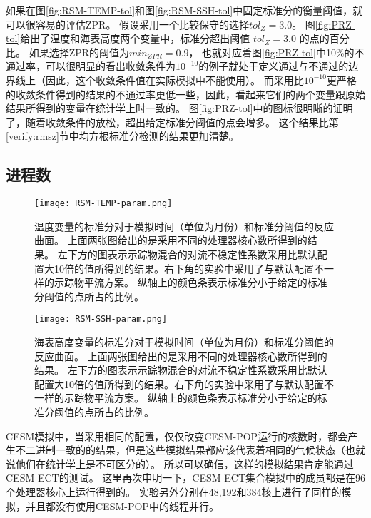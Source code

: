如果在图\ref{fig:RSM-TEMP-tol}和图\ref{fig:RSM-SSH-tol}中固定标准分的衡量阈值，就可以很容易的评估ZPR。 
假设采用一个比较保守的选择$tol_{Z} = 3.0$。 
图\ref{fig:PRZ-tol}给出了温度和海表高度两个变量中，标准分超出阈值 $tol_{Z} = 3.0$ 的点的百分比。 
如果选择ZPR的阈值为$min_{ZPR} = 0.9$， 也就对应着图\ref{fig:PRZ-tol}中10\%的不通过率，可以很明显的看出收敛条件为$10^{-10}$的例子就处于定义通过与不通过的边界线上（因此，这个收敛条件值在实际模拟中不能使用）。 
而采用比$10^{-10}$更严格的收敛条件得到的结果的不通过率更低一些，因此，看起来它们的两个变量跟原始结果所得到的变量在统计学上时一致的。
图\ref{fig:PRZ-tol}中的图标很明晰的证明了，随着收敛条件的放松，超出给定标准分阈值的点会增多。 
这个结果比第\ref{verify:rmsz}节中均方根标准分检测的结果更加清楚。 



\subsection{进程数}\label{verify:proc}
\begin {figure}[!ht]
\centering
\texttt{[image: RSM-TEMP-param.png]}
\caption {
温度变量的标准分对于模拟时间（单位为月份）和标准分阈值的反应曲面。
上面两张图给出的是采用不同的处理器核心数所得到的结果。
左下方的图表示示踪物混合的对流不稳定性系数采用比默认配置大10倍的值所得到的结果。右下角的实验中采用了与默认配置不一样的示踪物平流方案。
纵轴上的颜色条表示标准分小于给定的标准分阈值的点所占的比例。}
\label{fig:RSM-TEMP-param}
\end {figure}
 
\begin{figure} [!ht]
\centering
\texttt{[image: RSM-SSH-param.png]}
\caption {
海表高度变量的标准分对于模拟时间（单位为月份）和标准分阈值的反应曲面。
上面两张图给出的是采用不同的处理器核心数所得到的结果。
左下方的图表示示踪物混合的对流不稳定性系数采用比默认配置大10倍的值所得到的结果。右下角的实验中采用了与默认配置不一样的示踪物平流方案。
纵轴上的颜色条表示标准分小于给定的标准分阈值的点所占的比例。}
\label{fig:RSM-SSH-param}
\end {figure}

CESM模拟中，当采用相同的配置，仅仅改变CESM-POP运行的核数时，都会产生不二进制一致的的结果，但是这些模拟结果都应该代表着相同的气候状态（也就说他们在统计学上是不可区分的）。
所以可以确信，这样的模拟结果肯定能通过CESM-ECT的测试。 
这里再次申明一下，CESM-ECT集合模拟中的成员都是在96个处理器核心上运行得到的。
实验另外分别在48,192和384核上进行了同样的模拟，并且都没有使用CESM-POP中的线程并行。 


